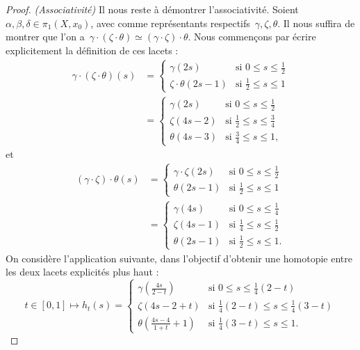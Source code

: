\begin{proof}
\bigskip \textit{(Associativité)} Il nous reste à démontrer l'associativité. Soient $\alpha,\beta,\delta\in\pi_1(X,x_0)$, avec comme représentants respectifs~$\gamma,\zeta,\theta$. Il nous suffira de  montrer que l'on a~$\gamma\cdot(\zeta\cdot\theta)\simeq(\gamma\cdot\zeta)\cdot\theta$. Nous commençons par écrire explicitement la définition de ces lacets : \[\begin{split}
\gamma\cdot(\zeta\cdot\theta)(s)&=\left\{\begin{matrix}
    \gamma(2s)&\text{si }0\leq s\leq\frac{1}{2}\\
    \zeta\cdot\theta(2s-1)&\text{si }\frac{1}{2}\leq s\leq 1
\end{matrix}\right.\\
&=\left\{\begin{matrix}
    \gamma(2s)&\text{si }0\leq s\leq\frac{1}{2}\\
    \zeta(4s-2)&\text{si }\frac{1}{2}\leq s\leq\frac{3}{4}\\
    \theta(4s-3)&\text{si }\frac{3}{4}\leq s\leq1,
\end{matrix}\right.
\end{split}\]et\[\begin{split}
(\gamma\cdot\zeta)\cdot\theta(s)&=\left\{\begin{matrix}
    \gamma\cdot\zeta(2s)&\text{si }0\leq s\leq\frac{1}{2}\\
    \theta(2s-1)&\text{si }\frac{1}{2}\leq s\leq 1
\end{matrix}\right.\\
&=\left\{\begin{matrix}
    \gamma(4s)&\text{si }0\leq s\leq\frac{1}{4}\\
    \zeta(4s-1)&\text{si }\frac{1}{4}\leq s\leq\frac{1}{2}\\
    \theta(2s-1)&\text{si }\frac{1}{2}\leq s\leq1.
\end{matrix}\right.
\end{split}\]On considère l'application suivante, dans l'objectif d'obtenir une homotopie entre les deux lacets explicités plus haut : \[t\in[0,1]\mapsto h_t(s)=\left\{\begin{matrix}
\gamma\left(\frac{4s}{2-t}\right)&\text{si }0\leq s\leq \frac{1}{4}(2-t)\\
\zeta\left(4s-2+t\right)&\text{si }\frac{1}{4}(2-t)\leq s\leq \frac{1}{4}(3-t)\\
\theta\left(\frac{4s-4}{1+t}+1\right)&\text{si }\frac{1}{4}(3-t)\leq s\leq1.

\end{matrix}\]
\end{proof}
